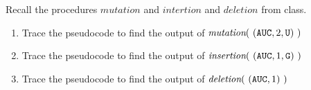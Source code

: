 
Recall the procedures $mutation$ and $intertion$ and $deletion$ from class.
\begin{enumerate}
    \item Trace the pseudocode to find the output of $\textit{mutation}(~ (\texttt{A}\texttt{U}\texttt{C}, 2, \texttt{U}) ~)$
    \item Trace the pseudocode to find the output of $\textit{insertion}(~(\texttt{A}\texttt{U}\texttt{C}, 1, \texttt{G})~)$
    \item Trace the pseudocode to find the output of $\textit{deletion}(~(\texttt{A}\texttt{U}\texttt{C}, 1)~)$
\end{enumerate}